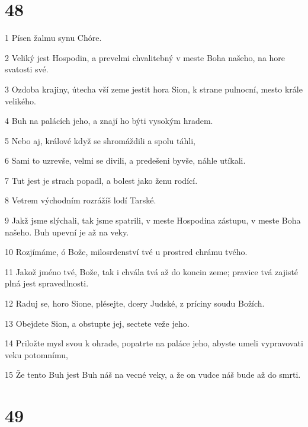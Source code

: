 \chapter{48}

\par 1 Písen žalmu synu Chóre.
\par 2 Veliký jest Hospodin, a prevelmi chvalitebný v meste Boha našeho, na hore svatosti své.
\par 3 Ozdoba krajiny, útecha vší zeme jestit hora Sion, k strane pulnocní, mesto krále velikého.
\par 4 Buh na palácích jeho, a znají ho býti vysokým hradem.
\par 5 Nebo aj, králové když se shromáždili a spolu táhli,
\par 6 Sami to uzrevše, velmi se divili, a predešeni byvše, náhle utíkali.
\par 7 Tut jest je strach popadl, a bolest jako ženu rodící.
\par 8 Vetrem východním rozrážíš lodí Tarské.
\par 9 Jakž jsme slýchali, tak jsme spatrili, v meste Hospodina zástupu, v meste Boha našeho. Buh upevní je až na veky.
\par 10 Rozjímáme, ó Bože, milosrdenství tvé u prostred chrámu tvého.
\par 11 Jakož jméno tvé, Bože, tak i chvála tvá až do koncin zeme; pravice tvá zajisté plná jest spravedlnosti.
\par 12 Raduj se, horo Sione, plésejte, dcery Judské, z príciny soudu Božích.
\par 13 Obejdete Sion, a obstupte jej, sectete veže jeho.
\par 14 Priložte mysl svou k ohrade, popatrte na paláce jeho, abyste umeli vypravovati veku potomnímu,
\par 15 Že tento Buh jest Buh náš na vecné veky, a že on vudce náš bude až do smrti.

\chapter{49}

